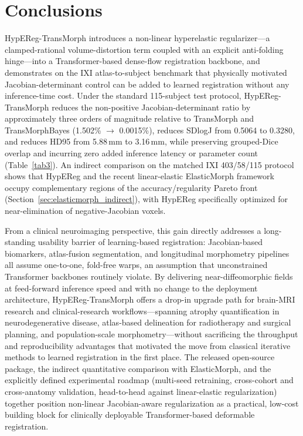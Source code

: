 \documentclass[jimaging,article,submit,pdftex,moreauthors]{Definitions/mdpi}
\begin{document}
\section{Conclusions}

HypEReg-TransMorph introduces a non-linear hyperelastic regularizer---a clamped-rational volume-distortion term coupled with an explicit anti-folding hinge---into a Transformer-based dense-flow registration backbone, and demonstrates on the IXI atlas-to-subject benchmark that physically motivated Jacobian-determinant control can be added to learned registration without any inference-time cost. Under the standard 115-subject test protocol, HypEReg-TransMorph reduces the non-positive Jacobian-determinant ratio by approximately three orders of magnitude relative to TransMorph and TransMorphBayes (1.502\% $\to$ 0.0015\%), reduces SDlogJ from 0.5064 to 0.3280, and reduces HD95 from 5.88\,mm to 3.16\,mm, while preserving grouped-Dice overlap and incurring zero added inference latency or parameter count (Table~\ref{tab3}). An indirect comparison on the matched IXI 403/58/115 protocol shows that HypEReg and the recent linear-elastic ElasticMorph framework occupy complementary regions of the accuracy/regularity Pareto front (Section~\ref{sec:elasticmorph_indirect}), with HypEReg specifically optimized for near-elimination of negative-Jacobian voxels.

From a clinical neuroimaging perspective, this gain directly addresses a long-standing usability barrier of learning-based registration: Jacobian-based biomarkers, atlas-fusion segmentation, and longitudinal morphometry pipelines all assume one-to-one, fold-free warps, an assumption that unconstrained Transformer backbones routinely violate. By delivering near-diffeomorphic fields at feed-forward inference speed and with no change to the deployment architecture, HypEReg-TransMorph offers a drop-in upgrade path for brain-MRI research and clinical-research workflows---spanning atrophy quantification in neurodegenerative disease, atlas-based delineation for radiotherapy and surgical planning, and population-scale morphometry---without sacrificing the throughput and reproducibility advantages that motivated the move from classical iterative methods to learned registration in the first place. The released open-source package, the indirect quantitative comparison with ElasticMorph, and the explicitly defined experimental roadmap (multi-seed retraining, cross-cohort and cross-anatomy validation, head-to-head against linear-elastic regularization) together position non-linear Jacobian-aware regularization as a practical, low-cost building block for clinically deployable Transformer-based deformable registration.
\end{document}
